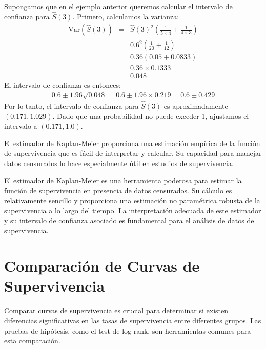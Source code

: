 \documentclass[a4paper]{report} %
\begin{document}
Supongamos que en el ejemplo anterior queremos calcular el intervalo de confianza para $\hat{S}(3)$. Primero, calculamos la varianza:
\begin{eqnarray*}
\text{Var}(\hat{S}(3)) &=& \hat{S}(3)^2 \left( \frac{1}{5 \times 4} + \frac{1}{4 \times 3} \right) \\
                       &=& 0.6^2 \left( \frac{1}{20} + \frac{1}{12} \right) \\
                       &=& 0.36 \left( 0.05 + 0.0833 \right) \\
                       &=& 0.36 \times 0.1333 \\
                       &=& 0.048
\end{eqnarray*}
El intervalo de confianza es entonces:
\begin{eqnarray*}
0.6 \pm 1.96 \sqrt{0.048} = 0.6 \pm 1.96 \times 0.219 = 0.6 \pm 0.429
\end{eqnarray*}
Por lo tanto, el intervalo de confianza para $\hat{S}(3)$ es aproximadamente $(0.171, 1.029)$. Dado que una probabilidad no puede exceder 1, ajustamos el intervalo a $(0.171, 1.0)$.

El estimador de Kaplan-Meier proporciona una estimaci\'on emp\'irica de la funci\'on de supervivencia que es f\'acil de interpretar y calcular. Su capacidad para manejar datos censurados lo hace especialmente \'util en estudios de supervivencia.

El estimador de Kaplan-Meier es una herramienta poderosa para estimar la funci\'on de supervivencia en presencia de datos censurados. Su c\'alculo es relativamente sencillo y proporciona una estimaci\'on no param\'etrica robusta de la supervivencia a lo largo del tiempo. La interpretaci\'on adecuada de este estimador y su intervalo de confianza asociado es fundamental para el an\'alisis de datos de supervivencia.


\chapter{Comparaci\'on de Curvas de Supervivencia}
Comparar curvas de supervivencia es crucial para determinar si existen diferencias significativas en las tasas de supervivencia entre diferentes grupos. Las pruebas de hip\'otesis, como el test de log-rank, son herramientas comunes para esta comparaci\'on.
\end{document}
